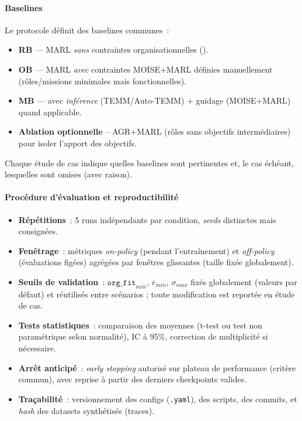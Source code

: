 \paragraph{Baselines}
\label{par:baselines}
Le protocole définit des baselines communes~:
\begin{itemize}
  \item \textbf{RB} — MARL \textit{sans} contraintes organisationnelles ().
  \item \textbf{OB} — MARL \textit{avec} contraintes MOISE+MARL définies manuellement (rôles/missions minimales mais fonctionnelles).
  \item \textbf{MB} —  avec \textit{inférence} (TEMM/Auto-TEMM) + guidage (MOISE+MARL) quand applicable.
  \item \textbf{Ablation optionnelle} -- AGR+MARL (rôles sans objectifs intermédiaires) pour isoler l’apport des objectifs.
\end{itemize}
Chaque étude de cas indique quelles baselines sont pertinentes et, le cas échéant, lesquelles sont omises (avec raison).

\paragraph{Procédure d’évaluation et reproductibilité}
\begin{itemize}
  \item \textbf{Répétitions}~: 5 runs indépendants par condition, \textit{seeds} distinctes mais consignées.
  \item \textbf{Fenêtrage}~: métriques \textit{on-policy} (pendant l’entraînement) et \textit{off-policy} (évaluations figées) agrégées par fenêtres glissantes (taille fixée globalement).
  \item \textbf{Seuils de validation}~: $\texttt{org\_fit}_{min}$, $\overline{r}_{min}$, $\sigma_{max}$ fixés globalement (valeurs par défaut) et réutilisés entre scénarios ; toute modification est reportée en étude de cas.
  \item \textbf{Tests statistiques}~: comparaison des moyennes (t-test ou test non paramétrique selon normalité), IC à 95\%, correction de multiplicité si nécessaire.
  \item \textbf{Arrêt anticipé}~: \textit{early stopping} autorisé sur plateau de performance (critère commun), avec reprise à partir des derniers checkpoints valides.
  \item \textbf{Traçabilité}~: versionnement des configs (\texttt{.yaml}), des scripts, des commits, et \textit{hash} des datasets synthétisés (traces).
\end{itemize}

